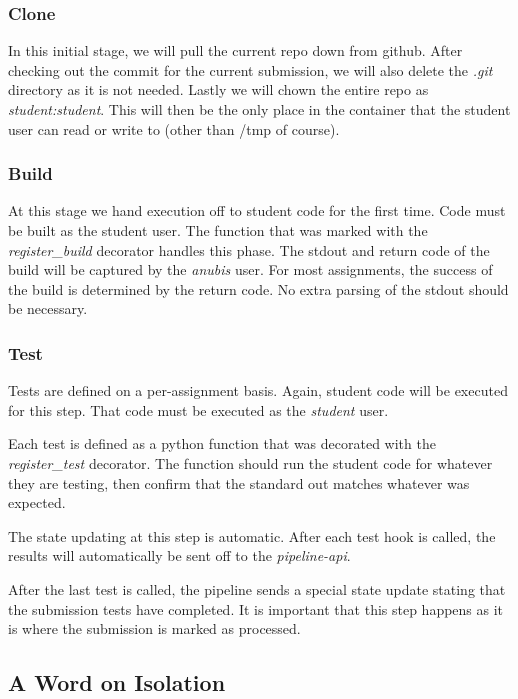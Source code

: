 \subsubsection{Clone}

In this initial stage, we will pull the current repo down from github.
After checking out the commit for the current submission, we will also delete
the \textit{.git} directory as it is not needed.
Lastly we will chown the entire repo as \textit{student:student}.
This will then be the only place in the container that the student user
can read or write to (other than /tmp of course).

\subsubsection{Build}

At this stage we hand execution off to student code for the first time.
Code must be built as the student user.
The function that was marked with the \textit{register\_build} decorator handles this phase.
The stdout and return code of the build will be captured by the \textit{anubis} user.
For most assignments, the success of the build is determined by the return code.
No extra parsing of the stdout should be necessary.

\subsubsection{Test}

Tests are defined on a per-assignment basis.
Again, student code will be executed for this step.
That code must be executed as the \textit{student} user.

Each test is defined as a python function that was decorated with the
\textit{register\_test} decorator.
The function should run the student code for whatever they are testing, then
confirm that the standard out matches whatever was expected.

The state updating at this step is automatic.
After each test hook is called, the results will automatically be sent off to the
\textit{pipeline-api}.

After the last test is called, the pipeline sends a special state update stating that
the submission tests have completed.
It is important that this step happens as it is where the submission is marked as
processed.

\subsection{A Word on Isolation}\label{subsec:a-word-on-isolation}


